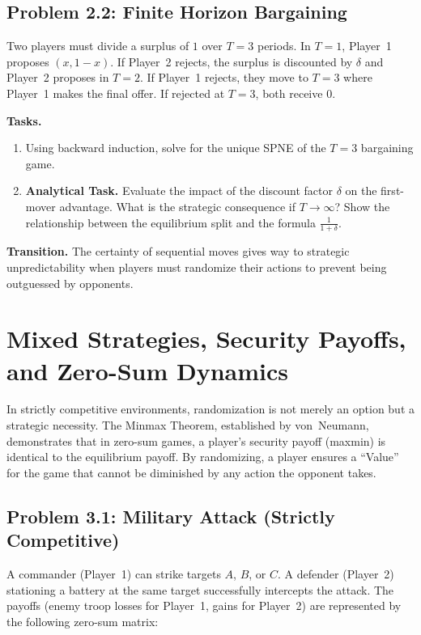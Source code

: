 \documentclass[12pt,a4paper]{article}
\begin{document}
\subsection*{Problem 2.2: Finite Horizon Bargaining}

Two players must divide a surplus of \(1\) over \(T = 3\) periods. In \(T = 1\), Player~1 proposes \((x, 1-x)\). If Player~2 rejects, the surplus is discounted by \(\delta\) and Player~2 proposes in \(T = 2\). If Player~1 rejects, they move to \(T = 3\) where Player~1 makes the final offer. If rejected at \(T = 3\), both receive \(0\).

\noindent\textbf{Tasks.}
\begin{enumerate}
  \item Using backward induction, solve for the unique SPNE of the \(T = 3\) bargaining game.
  \item \textbf{Analytical Task.} Evaluate the impact of the discount factor \(\delta\) on the first-mover advantage. What is the strategic consequence if \(T \to \infty\)? Show the relationship between the equilibrium split and the formula \(\frac{1}{1+\delta}\).
\end{enumerate}

\bigskip
\noindent\textbf{Transition.} The certainty of sequential moves gives way to strategic unpredictability when players must randomize their actions to prevent being outguessed by opponents.

\section{Mixed Strategies, Security Payoffs, and Zero-Sum Dynamics}

In strictly competitive environments, randomization is not merely an option but a strategic necessity. The Minmax Theorem, established by von~Neumann, demonstrates that in zero-sum games, a player's security payoff (maxmin) is identical to the equilibrium payoff. By randomizing, a player ensures a ``Value'' for the game that cannot be diminished by any action the opponent takes.

\subsection*{Problem 3.1: Military Attack (Strictly Competitive)}

A commander (Player~1) can strike targets \(A\), \(B\), or \(C\). A defender (Player~2) stationing a battery at the same target successfully intercepts the attack. The payoffs (enemy troop losses for Player~1, gains for Player~2) are represented by the following zero-sum matrix:
\end{document}
